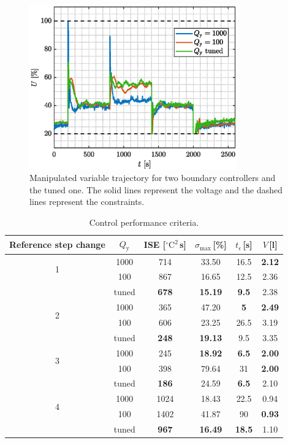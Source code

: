 \documentclass[preprint,12pt]{elsarticle}
\begin{document}
\begin{figure}
	\begin{center}
		\includegraphics[width=0.8\textwidth]{images/MV}
		\caption{Manipulated variable trajectory for two boundary controllers and the tuned one. The solid lines represent the voltage and the dashed lines represent the constraints.}
		\label{fig:MV}
	\end{center}
\end{figure}

\begin{table}[h!]
	\begin{center}
		\caption{Control performance criteria.}
		\label{tab:control_performance}
		\begin{tabular}{c|c|c|c|c|c} 
			Reference step change & $Q_\mathrm{y}$ & ISE [$^{\circ}\mathrm{C}^2$\,s] & $\sigma_{\mathrm{max}}$\,[\%] & $t_{\epsilon}$\,[s] & $V$\,[l] \\
			\hline
			\multirow{2}{*}{1} & 1000 & 714 & 33.50 & 16.5 & \textbf{2.12} \\
			    & 100 & 867 & 16.65 & 12.5 & 2.36 \\ 
			    & tuned & \textbf{678} & \textbf{15.19} & \textbf{9.5} & 2.38 \\ 
			\hline
			\multirow{2}{*}{2} & 1000 & 365 & 47.20 & \textbf{5} & \textbf{2.49} \\
			    & 100 & 606 & 23.25 & 26.5 & 3.19 \\ 
			    & tuned & \textbf{248} & \textbf{19.13} & 9.5 & 3.35 \\ 
			\hline
		    \multirow{2}{*}{3} & 1000 & 245 & \textbf{18.92} & \textbf{6.5} & \textbf{2.00} \\
				& 100 & 398 & 79.64 & 31 & \textbf{2.00} \\ 
				& tuned & \textbf{186} & 24.59 & \textbf{6.5} & 2.10 \\ 
			\hline
			\multirow{2}{*}{4} & 1000 & 1024 & 18.43 & 22.5 & 0.94 \\
				& 100 & 1402 & 41.87 & 90 & \textbf{0.93} \\ 
				& tuned & \textbf{967} & \textbf{16.49} & \textbf{18.5} & 1.10  
		\end{tabular}
	\end{center}
\end{table}
\end{document}
